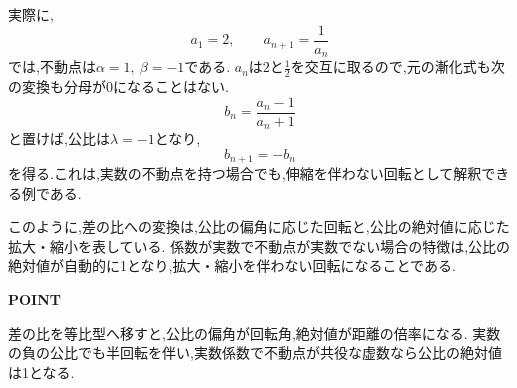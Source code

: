   実際に,
  \[
    a_1=2,\qquad a_{n+1}=\frac{1}{a_n}
  \]
  では,不動点は$\alpha=1,\ \beta=-1$である.
  $a_n$は$2$と$\frac{1}{2}$を交互に取るので,元の漸化式も次の変換も分母が0になることはない.
  \[
    b_n=\frac{a_n-1}{a_n+1}
  \]
  と置けば,公比は$\lambda=-1$となり,
  \[
    b_{n+1}=-b_n
  \]
  を得る.これは,実数の不動点を持つ場合でも,伸縮を伴わない回転として解釈できる例である.

  このように,差の比への変換は,公比の偏角に応じた回転と,公比の絶対値に応じた拡大・縮小を表している.
  係数が実数で不動点が実数でない場合の特徴は,公比の絶対値が自動的に1となり,拡大・縮小を伴わない回転になることである.

  \begin{bookpoint}
    \textbf{POINT}\par
    差の比を等比型へ移すと,公比の偏角が回転角,絶対値が距離の倍率になる.
    実数の負の公比でも半回転を伴い,実数係数で不動点が共役な虚数なら公比の絶対値は1となる.
  \end{bookpoint}
